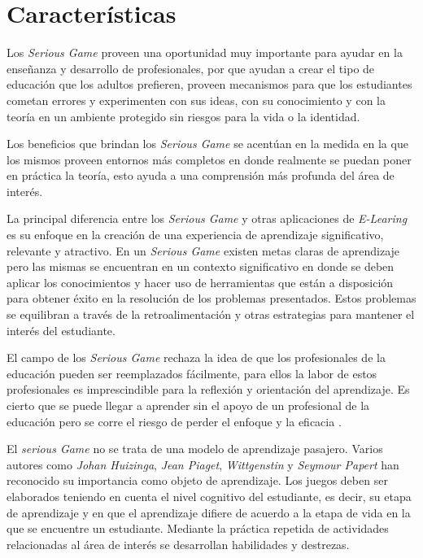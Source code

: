 \section{Características}

Los \emph{Serious Game} proveen una oportunidad muy importante para ayudar en la
enseñanza y desarrollo de profesionales, por que ayudan a crear el tipo de
educación que los adultos prefieren, proveen mecanismos para que los estudiantes
cometan errores y experimenten con sus ideas, con su conocimiento y con la
teoría en un ambiente protegido sin riesgos para la vida o la identidad. 

Los beneficios que brindan los \emph{Serious Game} se acentúan en la medida en
la que los mismos proveen entornos más completos en donde realmente se puedan
poner en práctica la teoría, esto ayuda a una comprensión más profunda del área
de interés.

La principal diferencia entre los \emph{Serious Game} y otras aplicaciones de
\emph{E-Learing} es su enfoque en la creación de una experiencia de aprendizaje
significativo, relevante y atractivo. En un \emph{Serious Game} existen metas
claras de aprendizaje pero las mismas se encuentran en un contexto significativo
en donde se deben aplicar los conocimientos y hacer uso de herramientas que
están a disposición para obtener éxito en la resolución de los problemas
presentados. Estos problemas se equilibran a través de la retroalimentación y
otras estrategias para mantener el interés del estudiante\cite{papertian:const}.

El campo de los \emph{Serious Game} rechaza la idea de que los profesionales de
la educación pueden ser reemplazados fácilmente, para ellos la labor de estos
profesionales es imprescindible para la reflexión y orientación del aprendizaje.
Es cierto que se puede llegar a aprender sin el apoyo de un profesional de la
educación pero se corre el riesgo de perder el enfoque y la eficacia
\cite{elearning:seiousgames}. 

El \emph{serious Game} no se trata de una modelo de aprendizaje pasajero. Varios
autores como \emph{Johan Huizinga}, \emph{Jean Piaget}, \emph{Wittgenstin} y
\emph{Seymour Papert} han reconocido su importancia como objeto de aprendizaje.
Los juegos deben ser elaborados teniendo en cuenta el nivel cognitivo del
estudiante, es decir, su etapa de aprendizaje y en que el aprendizaje difiere de
acuerdo a la etapa de vida en la que se encuentre un estudiante. Mediante la
práctica repetida de actividades relacionadas al área de interés se desarrollan
habilidades y destrezas\cite{education:games}.

